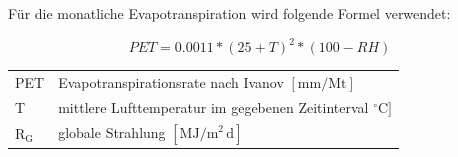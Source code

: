 Für die monatliche Evapotranspiration wird folgende Formel verwendet:

\begin{equation}
\label{eq:ivanov_m}
PET=0.0011*(25+T)^2*(100-RH)
\end{equation}
\begin{table}[H]
\centering
\begin{tabular}{ll}
PET & Evapotranspirationsrate nach Ivanov  $\mathrm{[mm/Mt]}$\\
T & mittlere Lufttemperatur im gegebenen Zeitinterval $\mathrm{{^\circ}C]}$\\
$\mathrm{R_G}$ & globale Strahlung $\mathrm{[MJ/m^2\,d]}$\\
\end{tabular}
\end{table}






